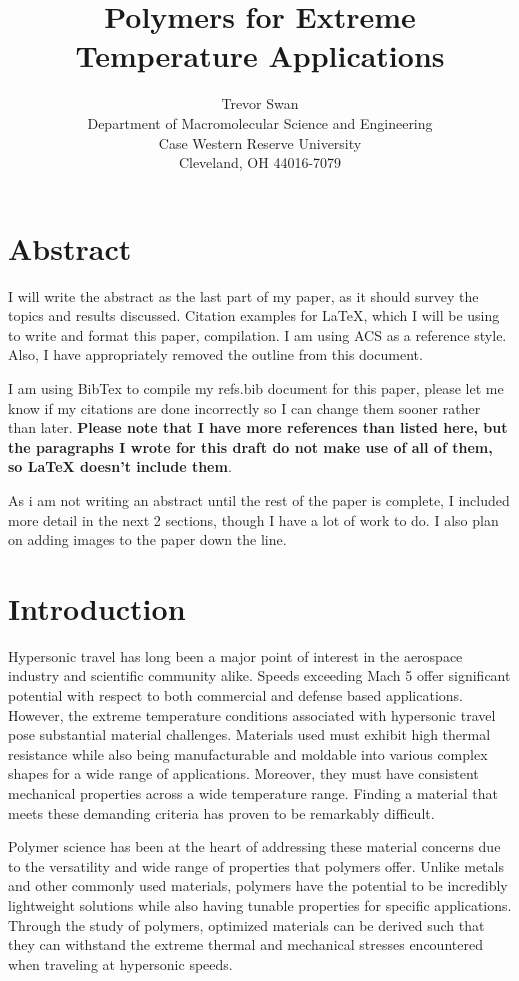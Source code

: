 \documentclass[12pt]{article}
\title{Polymers for Extreme Temperature Applications}
\author{Trevor Swan \\
Department of Macromolecular Science and Engineering \\ 
Case Western Reserve University \\
Cleveland, OH 44016-7079}
\date{}
\begin{document}
\maketitle

\section{Abstract}

\indent I will write the abstract as the last part of my paper, as it should survey the topics and results discussed. Citation examples for LaTeX, which I will be using to write and format this paper, compilation. I am using ACS as a reference style. Also, I have appropriately removed the outline from this document.
	
\indent I am using BibTex to compile my refs.bib document for this paper, please let me know if my citations are done incorrectly so I can change them sooner rather than later. \textbf{Please note that I have more references than listed here, but the paragraphs I wrote for this draft do not make use of all of them, so LaTeX doesn't include them}.

\indent As i am not writing an abstract until the rest of the paper is complete, I included more detail in the next 2 sections, though I have a lot of work to do. I also plan on adding images to the paper down the line.

\section{Introduction}

\indent Hypersonic travel has long been a major point of interest in the aerospace industry and scientific community alike. Speeds exceeding Mach 5 offer significant potential with respect to both commercial and defense based applications. However, the extreme temperature conditions associated with hypersonic travel pose substantial material challenges. Materials used must exhibit high thermal resistance while also being manufacturable and moldable into various complex shapes for a wide range of applications. Moreover, they must have consistent mechanical properties across a wide temperature range. Finding a material that meets these demanding criteria has proven to be remarkably difficult.
	
\indent Polymer science has been at the heart of addressing these material concerns due to the versatility and wide range of properties that polymers offer. Unlike metals and other commonly used materials, polymers have the potential to be incredibly lightweight solutions while also having tunable properties for specific applications. Through the study of polymers, optimized materials can be derived such that they can withstand the extreme thermal and mechanical stresses encountered when traveling at hypersonic speeds. 
\end{document}
